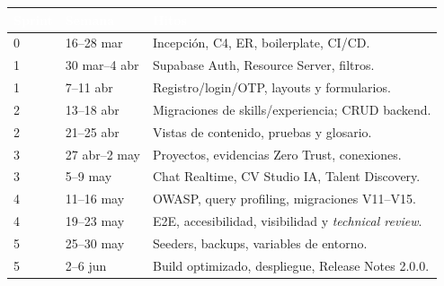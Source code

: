 \renewcommand{\arraystretch}{1.3}
\fontsize{8.8}{10.5}\selectfont\sffamily
\noindent
\begin{tabularx}{\textwidth}{|l|l|X|}
\hline
\rowcolor{colorPrimario}
\textcolor{white}{\textbf{Sprint}} & \textcolor{white}{\textbf{Semana}} & \textcolor{white}{\textbf{Hitos}} \\ \hline
0 & 16--28 mar & Incepción, C4, ER, boilerplate, CI/CD. \\ \hline
\rowcolor{grisTecnico}
1 & 30 mar--4 abr & Supabase Auth, Resource Server, filtros. \\ \hline
1 & 7--11 abr & Registro/login/OTP, layouts y formularios. \\ \hline
\rowcolor{grisTecnico}
2 & 13--18 abr & Migraciones de skills/experiencia; CRUD backend. \\ \hline
2 & 21--25 abr & Vistas de contenido, pruebas y glosario. \\ \hline
\rowcolor{grisTecnico}
3 & 27 abr--2 may & Proyectos, evidencias Zero Trust, conexiones. \\ \hline
3 & 5--9 may & Chat Realtime, CV Studio IA, Talent Discovery. \\ \hline
\rowcolor{grisTecnico}
4 & 11--16 may & OWASP, query profiling, migraciones V11--V15. \\ \hline
4 & 19--23 may & E2E, accesibilidad, visibilidad y \textit{technical review}. \\ \hline
\rowcolor{grisTecnico}
5 & 25--30 may & Seeders, backups, variables de entorno. \\ \hline
5 & 2--6 jun & Build optimizado, despliegue, Release Notes 2.0.0. \\ \hline
\end{tabularx}\normalfont\normalsize

\clearpage
